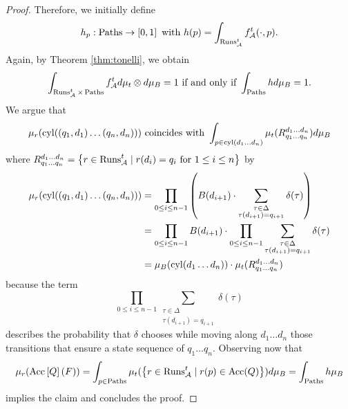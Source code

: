 \begin{proof}
  Therefore, we initially define
  \begin{equation*}
    h_{p}:\operatorname{Paths}\rightarrow\left[0,1\right]\text{ with }
      h(p) = \int_{\operatorname{Runs}_{\mathcal{A}}^{t}}f_{\mathcal{A}}^{t}(\cdot, p).
  \end{equation*}
  Again, by Theorem \ref{thm:tonelli}, we obtain
  \begin{equation*}
    \int_{\operatorname{Runs}_{\mathcal{A}}^{t}\times\operatorname{Paths}}f_{\mathcal{A}}^{t}
      d\mu_{t}\otimes d\mu_{B} = 1
    \text{ if and only if }\int_{\operatorname{Paths}}h d\mu_{B} = 1.
  \end{equation*}
  We argue that 
  \begin{equation*}
    \mu_{r}(\operatorname{cyl}(\left(q_{1}, d_{1}\right)\dots\left(q_{n}, d_{n}\right)))
    \text{ coincides with }\int_{p\in\operatorname{cyl}(d_{1}\dots d_{n})}\mu_{t}(
    R^{d_{1}\dots d_{n}}_{q_{1}\dots q_{n}})d\mu_{B}
  \end{equation*} 
  where $R^{d_{1}\dots d_{n}}_{q_{1}\dots q_{n}} = \left\{
    r\in\operatorname{Runs}_{\mathcal{A}}^{t}\mid r(d_{i}) = q_{i}\text{ for }1\leq i\leq n\right\}$
  by
  \begin{align*}
    \mu_{r}(\operatorname{cyl}(\left(q_{1}, d_{1}\right)\dots\left(q_{n}, d_{n}\right))) &=
      \prod\limits_{0\leq i\leq n-1}\left(B(d_{i+1})\cdot\sum\limits_{
        \substack{\tau\in\Delta\\\tau(d_{i+1}) = q_{i+1}}}\delta(\tau)\right)\\
    &=\prod\limits_{0\leq i\leq n-1}B(d_{i+1})\cdot\prod
        \limits_{0\leq i\leq n-1}\sum\limits_{\substack{
        \tau\in\Delta\\\tau(d_{i+1}) = q_{i+1}}}\delta(\tau)\\
    &=\mu_{B}(\operatorname{cyl}(d_{1}\dots d_{n}))\cdot\mu_{t}(
        R^{d_{1}\dots d_{n}}_{q_{1}\dots q_{n}})\\
  \end{align*}
  because the term
  \begin{equation*}
    \prod\limits_{0\leq i\leq n-1}\sum\limits_{\substack{
    \tau\in\Delta\\\tau(d_{i+1}) = q_{i+1}}}\delta(\tau)
  \end{equation*} 
  describes the probability that $\delta$ chooses while moving along
  $d_{1}\dots d_{n}$ those transitions that ensure a state sequence  of
  $q_{1}\dots q_{n}$. Observing now that
  \begin{equation*}
    \mu_{r}(\operatorname{Acc}\left[Q\right](F)) = 
    \int_{p\in\operatorname{Paths}}\mu_{t}(\left\{r\in\operatorname{Runs}_{\mathcal{A}}^{t}\mid
      r(p)\in\operatorname{Acc}(Q)\right\}) d\mu_{B} = \int_{\operatorname{Paths}} h\mu_{B}
  \end{equation*}
  implies the claim and concludes the proof.
\end{proof}
